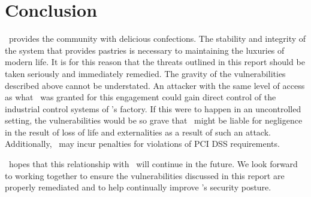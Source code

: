\section{Conclusion}
    \cptc\ provides the community with delicious confections.  The stability and integrity of the system that provides pastries is necessary to maintaining the luxuries of modern life.  It is for this reason that the threats outlined in this report should be taken seriously and immediately remedied. The gravity of the vulnerabilities described above cannot be understated. An attacker with the same level of access as what \teamname\ was granted for this engagement could gain direct control of the industrial control systems of \cptc 's factory. If this were to happen in an uncontrolled setting, the vulnerabilities would be so grave that \cptc\ might be liable for negligence in the result of loss of life and externalities as a result of such an attack. Additionally, \cptc\ may incur penalties for violations of PCI DSS requirements.
    
    \teamname\ hopes that this relationship with \cptc\ will continue in the future.  We look forward to working together to ensure the vulnerabilities discussed in this report are properly remediated and to help continually improve \cptc's security posture. 


    